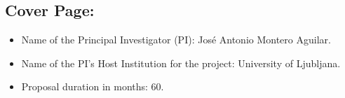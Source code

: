 \subsection*{Cover Page:}
\begin{itemize}
  \item Name of the Principal Investigator (PI): José Antonio Montero Aguilar.
  \item Name of the PI’s Host Institution for the project: University of Ljubljana.
  \item Proposal duration in months: 60.
\end{itemize}